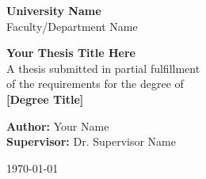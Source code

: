 \begin{titlepage}
    \centering
    \vspace*{2cm}
    
    {\LARGE\textbf{University Name}}\\
    \vspace{0.5cm}
    {\large Faculty/Department Name}\\
    \vspace{2cm}
    
    {\Huge\textbf{Your Thesis Title Here}}\\
    \vspace{1cm}
    {\large A thesis submitted in partial fulfillment\\
    of the requirements for the degree of\\
    \textbf{[Degree Title]}}\\
    \vspace{2cm}
    
    {\large\textbf{Author:} Your Name}\\
    \vspace{0.5cm}
    {\large\textbf{Supervisor:} Dr. Supervisor Name}\\
    \vspace{2cm}
    
    {\large\today}
    
    \vfill
\end{titlepage}

\cleardoublepage